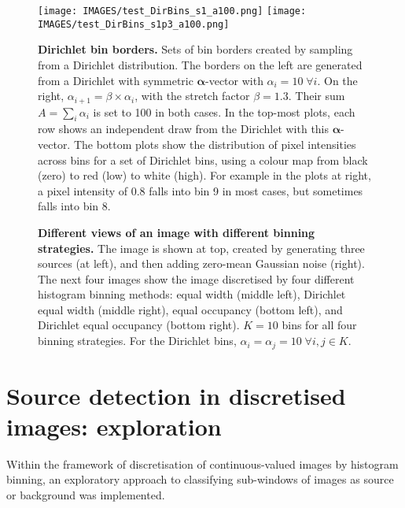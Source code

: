 \begin{figure}
\begin{center}
\texttt{[image: IMAGES/test\_DirBins\_s1\_a100.png]}
\texttt{[image: IMAGES/test\_DirBins\_s1p3\_a100.png]}
\caption[Dirichlet bin borders]{\textbf{Dirichlet bin borders.} Sets of bin borders created by sampling from a Dirichlet distribution. The borders on the left are generated from a Dirichlet with symmetric $\boldsymbol{\alpha}$-vector with $\alpha_i = 10 \; \forall i$. On the right, $\alpha_{i+1} = \beta \times
  \alpha_{i} $, with the stretch factor $\beta = 1.3$. Their sum $A
  =\sum_i\alpha_i$ is set to 100 in both cases. In the top-most plots, each row shows an independent draw from the Dirichlet with this $\boldsymbol{\alpha}$-vector. The bottom plots show the distribution of pixel intensities across bins for a set of Dirichlet bins, using a colour map from black (zero) to red (low) to white (high). For example in the plots at right, a pixel intensity of 0.8 falls into bin 9 in most cases, but sometimes falls into bin 8.}
\end{center}
\label{fig:test_DirBins}
\end{figure}


\begin{figure}
\centering
{}
\caption[Binned views of an image]{\textbf{Different views of an image with different binning strategies.} The image is shown at top, created by generating three sources (at left), and then adding zero-mean Gaussian noise (right). The next four images show the image discretised by four different histogram binning methods: equal width (middle left), Dirichlet equal width (middle right), equal occupancy (bottom left), and Dirichlet equal occupancy (bottom right). $K=10$ bins for all four binning strategies. For the Dirichlet bins, $\alpha_i = \alpha_j = 10 \; \forall i,j \in K$.}
\label{fig:binned-images}
\end{figure}


\section[Discretised images: exploration]{Source detection in discretised images: exploration}\label{sec:multi}
Within the framework of discretisation of continuous-valued images by histogram binning, an exploratory approach to classifying sub-windows of images as source or background was implemented.

